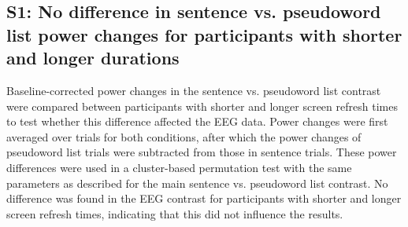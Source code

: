 \subsection{S1: No difference in sentence vs. pseudoword list power changes for participants with shorter and longer durations} \label{suppl-note}
Baseline-corrected power changes in the sentence vs. pseudoword list contrast were compared between participants with shorter and longer screen refresh times to test whether this difference affected the EEG data. Power changes were first averaged over trials for both conditions, after which the power changes of pseudoword list trials were subtracted from those in sentence trials. These power differences were used in a cluster-based permutation test with the same parameters as described for the main sentence vs. pseudoword list contrast. No difference was found in the EEG contrast for participants with shorter and longer screen refresh times, indicating that this did not influence the results.

 
